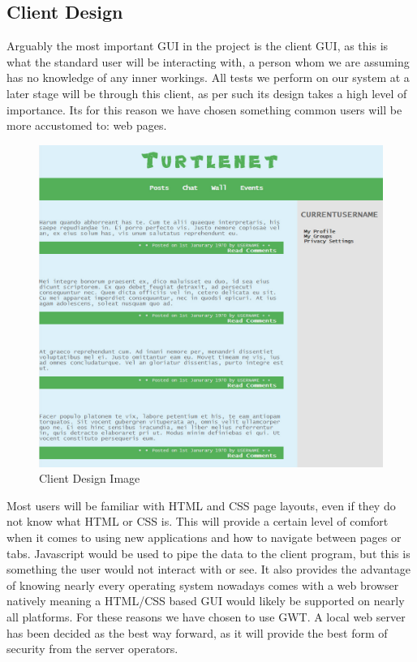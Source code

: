 \subsection{Client Design}
Arguably the most important GUI in the project is the client GUI, as this is what
the standard user will be interacting with, a person whom we are assuming has no
knowledge of any inner workings. All tests we perform on our system at a later 
stage will be through this client, as per such its design takes a high level of
importance. Its for this reason we have chosen something common users will be 
more accustomed to: web pages.

\begin{figure}[H]
    \centering
    \includegraphics[width=\textwidth]{images/design/client_interface.jpg}
    \caption{Client Design Image}
    \label{fig:client}
\end{figure}

Most users will be familiar with HTML and CSS page layouts, even if they do not
know what HTML or CSS is. This will provide a certain level of comfort when it 
comes to using new applications and how to navigate between pages or tabs.
Javascript would be used to pipe the data to the client program, but this is 
something the user would not interact with or see. It also provides the 
advantage of knowing nearly every operating system nowadays comes with a web 
browser natively meaning a HTML/CSS based GUI would likely be supported on 
nearly all platforms. For these reasons we have chosen to use GWT. A local web
server has been decided as the best way forward, as it will provide the best
form of security from the server operators.

